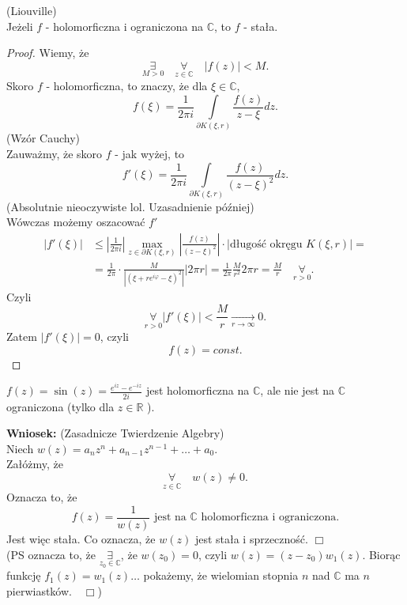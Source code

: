 \documentclass[../main.tex]{subfiles}
\begin{document}
    \begin{tw}
        (Liouville)\\
        Jeżeli $f$ - holomorficzna i ograniczona na $\mathbb{C}$, to $f$ - stała.
    \end{tw}
    \begin{proof}
        Wiemy, że
        \[
            \underset{M > 0}{\exists} \quad \underset{z\in\mathbb{C}}{\forall} \quad |f(z)| < M
        .\]
    Skoro $f$ - holomorficzna, to znaczy, że dla $\xi\in\mathbb{C}$,
        \[
            f(\xi) = \frac{1}{2\pi i}\int\limits_{\partial K(\xi, r)}\frac{f(z)}{z-\xi}dz
        .\]
    (Wzór Cauchy)\\
    Zauważmy, że skoro $f$ - jak wyżej, to
        \[
            f'(\xi) = \frac{1}{2\pi i} \int\limits_{\partial K(\xi,r)} \frac{f(z)}{(z - \xi)^2}dz
        .\]
    (Absolutnie nieoczywiste lol. Uzasadnienie później)\\
        Wówczas możemy oszacować $f'$
        \begin{align*}
            |f'(\xi)| &\le \left|\frac{1}{2\pi i}\right| \max\limits_{z\in \partial K(\xi,r)}\left| \frac{f(z)}{(z-\xi)^2}\right|\cdot \left| \text{długość okręgu } K(\xi,r) \right| =\\
            &= \frac{1}{2\pi}\cdot \frac{M}{\left| \left(\xi + re^{i\varphi} - \xi\right)^2 \right| } \left| 2\pi r \right| = \frac{1}{2\pi} \frac{M}{r^2} 2\pi r = \frac{M}{r} \quad\underset{r>0}{\forall}
        .\end{align*}
    Czyli
        \[
            \underset{r>0}{\forall} \left| f'(\xi) \right| < \frac{M}{r} \underset{r\to\infty}{\longrightarrow} 0
        .\]
    Zatem $\left| f'(\xi) \right| = 0$,
        czyli
        \[
            f(z) = const
        .\]
    \end{proof}
    \begin{przyklad}
        $f(z) = \sin(z) = \frac{e^{iz} - e^{-iz}}{2i}$ jest holomorficzna na $\mathbb{C}$, ale nie jest na $\mathbb{C}$ ograniczona (tylko dla $z\in\mathbb{R}$ ).
    \end{przyklad}
    \textbf{Wniosek:} (Zasadnicze Twierdzenie Algebry)\\
    Niech $w(z) = a_nz^n + a_{n-1}z^{n-1} + \ldots + a_0$.\\
    Załóżmy, że
    \[
        \underset{z\in\mathbb{C}}{\forall} \quad w(z) \neq 0
    .\]
Oznacza to, że
\[
    f(z) = \frac{1}{w(z)}\text{ jest na } \mathbb{C} \text{ holomorficzna i ograniczona}
.\]
Jest więc stała. Co oznacza, że $w(z)$ jest stała i sprzeczność. $\Box$\\
(PS oznacza to, że $\underset{z_0\in\mathbb{C}}{\exists} $, że $w(z_0) = 0$, czyli $w(z) = (z-z_0)w_1(z)$. Biorąc funkcję $f_1(z) = w_1(z)\ldots$ pokażemy, że wielomian stopnia $n$ nad $\mathbb{C}$ ma $n$ pierwiastków.$\quad\Box$)
\end{document}
